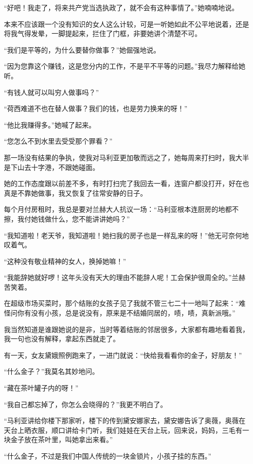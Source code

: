 \par “好吧！我走了，将来共产党当选执政了，就不会有这种事情了。”她喃喃地说。
\par 本来不应该跟一个没有知识的女人这么计较，可是一听她如此不公平地说着，还是将我气得发晕，一脚提起来，拦住了门框，非要她讲个清楚不可。
\par “我们是平等的，为什么要替你做事？”她倔强地说。
\par “因为您靠这个赚钱，这是您分内的工作，不是平不平等的问题。”我尽力解释给她听。
\par “有钱人就可以叫穷人做事吗？”
\par “荷西难道不也在替人做事？我们的钱，也是劳力换来的呀！”
\par “他比我赚得多。”她喊了起来。
\par “您怎么不到水里去受受那个罪看？”
\par 那一场没有结果的争执，使我对马利亚更加敬而远之了，她每周来打扫时，我大半是下山去十字港，不跟她碰面。
\par 她的工作态度跟以前差不多，有时打扫完了我回去一看，连窗户都没打开，好在也真是不靠她做事，我又恢复了往常安静的日子。
\par 每个月付房租时，我总是要对兰赫大人抗议一场：“马利亚根本连厨房的地都不擦，我付她钱做什么，您不能讲讲她吗？”
\par “我知道啦！老天爷，我知道啦！她扫我的房子也是一样乱来的呀！”他无可奈何地叹着气。
\par “这种没有敬业精神的女人，换掉她嘛！”
\par “我能辞她就好啰！这年头没有天大的理由不能辞人呢！工会保护很周全的。”兰赫苦笑着。
\par 在超级市场买菜时，那个结账的女孩子见了我就不管三七二十一地叫了起来：“难怪问你有没有小孩，总是说没有，原来是不结婚同居的，啧，啧，真新派哦。”
\par 我当然知道是谁跟她说的是非，当时等着结账的邻居很多，大家都有趣地看着我，我一句也没有解释，拿起东西就走了。
\par 有一天，女友黛娥照例跑来了，一进门就说：“快给我看看你的金子，好朋友！”
\par “什么金子？”我莫名其妙地问。
\par “藏在茶叶罐子内的呀！”
\par “我自己都忘掉了，你怎么会晓得的？”我更不明白了。
\par “马利亚讲给你楼下那家听，楼下的传到黛安娜家去，黛安娜告诉了奥薇，奥薇在天台上晒衣服，顺口讲给卡门听，我们娃娃在天台上玩，回来说，妈妈，三毛有一块金子放在茶叶里，叫她拿出来看。”
\par “什么金子，不过是我们中国人传统的一块金锁片，小孩子挂的东西。”

